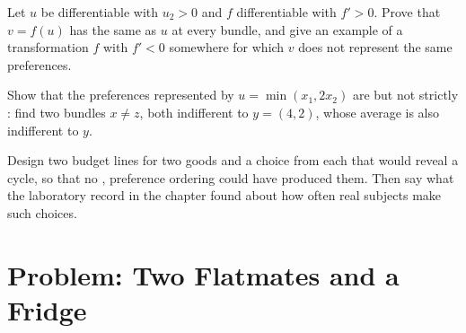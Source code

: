\begin{exercise}[$\star\star\star$]\label{exo:b1:preferences-and-utility:transform}
Let $u$ be differentiable with $u_2 > 0$ and $f$ differentiable with $f' > 0$.
Prove that $v = f(u)$ has the same  as $u$ at every bundle, and give an
example of a transformation $f$ with $f' < 0$ somewhere for which $v$ does not
represent the same preferences.
\end{exercise}

\begin{exercise}[$\star\star\star$]\label{exo:b1:preferences-and-utility:convex-not-strict}
Show that the preferences represented by $u = \min(x_1, 2x_2)$ are 
but not strictly : find two bundles $x \neq z$, both indifferent to
$y = (4, 2)$, whose average is also indifferent to $y$.
\end{exercise}

\begin{exercise}[$\star\star\star$]\label{exo:b1:preferences-and-utility:design}
Design two budget lines for two goods and a choice from each that
would reveal a cycle, so that no ,  preference ordering
could have produced them. Then say what the laboratory record in the
chapter found about how often real subjects make such choices.
\end{exercise}

\section{Problem: Two Flatmates and a Fridge}\label{sec:b1:preferences-and-utility:problem}

